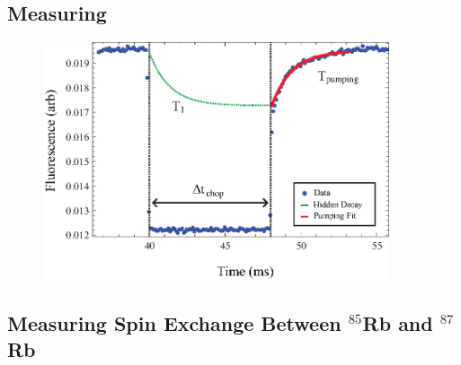 \subsection{Measuring}

\begin{figure}[htbp]
\begin{center}
\includegraphics[height=70mm]{./figures/raw_chop.eps}
\caption{\small{}}
\label{fig:chop}
\end{center}
\end{figure}

\subsection{Measuring Spin Exchange Between $^{85}$Rb and $^{87}$Rb}
